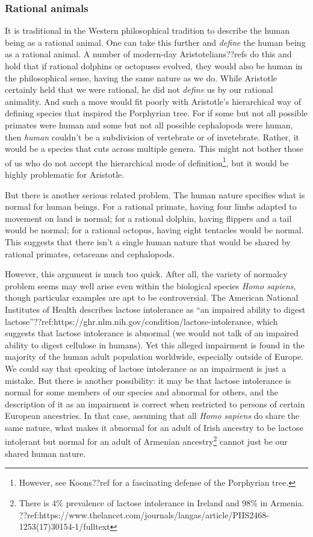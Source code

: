 \subsubsection{Rational animals}
It is traditional in the Western philosophical tradition to describe the human being as a rational animal. One can
take this further and \textit{define} the human being as a rational animal. A number of modern-day Aristotelians??refs do this
and hold that if rational dolphins or octopuses evolved, they would also be human in the philosophical sense, having the 
same nature as we do. While Aristotle certainly held that we were rational, he did not \textit{define} us by our rational animality.
And such a move would fit poorly with Aristotle's hierarchical
way of defining species that inspired the Porphyrian tree. For if some but not all possible primates were human and some 
but not all possible cephalopods were human, then \textit{human} couldn't be a subdivision of vertebrate or of invetebrate. Rather, 
it would be a species that cuts across multiple genera. This might not bother those of us who do not accept the hierarchical
mode of definition\footnote{However, see Koons??ref for a fascinating defense of the Porphyrian tree.}, but it would be 
highly problematic for Aristotle. 

But there is another serious related problem. The human nature specifies what is normal for human beings. For a rational
primate, having four limbs adapted to movement on land is normal; for a rational dolphin, having flippers and a tail would be 
normal; for a rational octopus, having eight tentacles would be normal. This suggests that there isn't a single human nature
that would be shared by rational primates, cetaceans and cephalopods. 

However, this argument is much too quick. After all, the variety of normalcy problem seems may well arise even within the 
biological species \textit{Homo sapiens}, though particular examples are apt to be controversial. The American National
Institutes of Health describes lactose intolerance as ``an impaired ability to digest lactose''??ref:https://ghr.nlm.nih.gov/condition/lactose-intolerance,
which suggests that lactose intolerance is abnormal (we would not talk of an impaired ability to digest cellulose in humans).
Yet this alleged impairment is found in the majority of the human adult population worldwide, especially outside of Europe.
We could say that speaking of lactose intolerance as an impairment is just a mistake. But there is another possibility: it may
be that lactose intolerance is normal for some members of our species and abnormal for others, and the description of it as
an impairment is correct when restricted to persons of certain European ancestries.
In that case, assuming that all \textit{Homo sapiens} do share the same nature, what makes it abnormal for an adult
of Irish ancestry to be lactose intolerant but normal for an adult of Armenian ancestry\footnote{There is 4\% prevalence of
lactose intolerance in Ireland and 98\% in Armenia. ??ref:https://www.thelancet.com/journals/langas/article/PIIS2468-1253(17)30154-1/fulltext }
cannot just be our shared human nature. 

